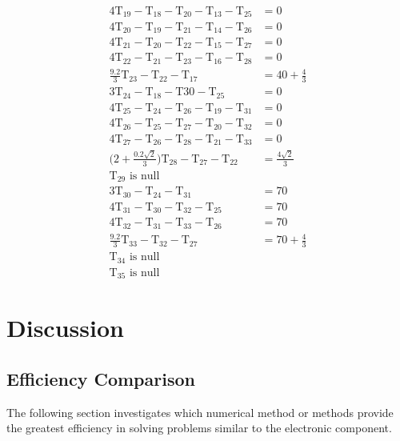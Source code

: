 \documentclass[12pt,a4paper]{article}
\begin{document}
\begin{align*}
  4\text{T}_{19}-\text{T}_{18}-\text{T}_{20}-\text{T}_{13}-\text{T}_{25} & =0\\
  4\text{T}_{20}-\text{T}_{19}-\text{T}_{21}-\text{T}_{14}-\text{T}_{26} & =0\\
  4\text{T}_{21}-\text{T}_{20}-\text{T}_{22}-\text{T}_{15}-\text{T}_{27} & =0\\
  4\text{T}_{22}-\text{T}_{21}-\text{T}_{23}-\text{T}_{16}-\text{T}_{28} & =0\\
  \frac{9.2}{3}\text{T}_{23}-\text{T}_{22}-\text{T}_{17} & =40+\frac{4}{3}\\
  3\text{T}_{24}-\text{T}_{18}-\text{T}{30}-\text{T}_{25} &=0\\
  4\text{T}_{25}-\text{T}_{24}-\text{T}_{26}-\text{T}_{19}-\text{T}_{31} & =0\\
  4\text{T}_{26}-\text{T}_{25}-\text{T}_{27}-\text{T}_{20}-\text{T}_{32} & =0\\
  4\text{T}_{27}-\text{T}_{26}-\text{T}_{28}-\text{T}_{21}-\text{T}_{33} & =0\\
  \bigg(2+\frac{0.2\sqrt{2}}{3}\bigg)\text{T}_{28}-\text{T}_{27}-\text{T}_{22} & =\frac{4\sqrt{2}}{3}\\
  \text{T}_{29} \text{ is null}\\
  3\text{T}_{30}-\text{T}_{24}-\text{T}_{31} &=70\\
  4\text{T}_{31}-\text{T}_{30}-\text{T}_{32}-\text{T}_{25} &=70\\
  4\text{T}_{32}-\text{T}_{31}-\text{T}_{33}-\text{T}_{26} &=70\\
  \frac{9.2}{3}\text{T}_{33}-\text{T}_{32}-\text{T}_{27} & =70+\frac{4}{3}\\
  \text{T}_{34} \text{ is null}\\
  \text{T}_{35} \text{ is null}
\end{align*}
%
%
%

\section{Discussion}

\subsection{Efficiency Comparison}
The following section investigates which numerical method or methods provide the greatest efficiency in solving problems similar to the electronic component.
\end{document}
